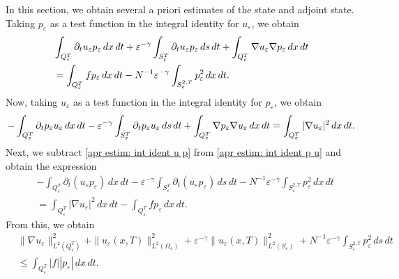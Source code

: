 \documentclass[10pt,a4paper]{amsart}
\numberwithin{equation}{section}
\begin{document}
In this section, we obtain several a priori estimates of the state and adjoint
state. Taking $p_{\varepsilon }$ as a test function in the integral identity
for $u_{\varepsilon }$, we obtain
\begin{equation}
\begin{aligned}
&\int _{Q_{\varepsilon }^{T}}\partial _{t}u_{\varepsilon
}p_{\varepsilon }\,dx\,dt+\varepsilon ^{-\gamma }\int _{S_{\varepsilon
}^{T}}\partial _{t}u_{\varepsilon }p_{\varepsilon }\,ds\,dt+\int
_{Q_{\varepsilon }^{T}}\nabla u_{\varepsilon }\nabla p_{\varepsilon }{%
\,dx\,dt} \\
&=\int _{Q_{\varepsilon }^{T}}fp_{\varepsilon }\,dx\,dt%
-N^{-1}\varepsilon ^{-\gamma }\int _{S_{\varepsilon
}^{2,T}}p_{\varepsilon }^2\,dx\,dt.
\end{aligned} \label{apr estim: int ident u p}
\end{equation}
Now, taking $u_{\varepsilon }$ as a test function in the integral identity
for $p_{\varepsilon }$, we obtain
\begin{equation}
-\int _{Q_{\varepsilon }^{T}}\partial _{t}p_{\varepsilon
}u_{\varepsilon }\,dx\,dt-\varepsilon ^{-\gamma }\int _{S_{\varepsilon
}^{T}}\partial _{t}p_{\varepsilon }u_{\varepsilon }\,ds\,dt+\int
_{Q_{\varepsilon }^{T}}\nabla p_{\varepsilon }\nabla u_{\varepsilon }{%
\,dx\,dt}
=\int _{Q_{\varepsilon }^{T}}|\nabla u_{\varepsilon }|^2\,dx\,dt.
\label{apr estim: int ident p u}
\end{equation}%
Next, we subtract \eqref{apr estim: int ident u p} from
\eqref{apr estim: int ident p u} and obtain the expression
\begin{align*}
&-\int _{Q_{\varepsilon }^{T}}\partial _{t}(u_{\varepsilon
}p_{\varepsilon })\,dx\,dt-\varepsilon ^{-\gamma }\int _{S_{\varepsilon
}^{T}}\partial _{t}(u_{\varepsilon }p_{\varepsilon })\,ds\,dt%
-N^{-1}\varepsilon ^{-\gamma }\int _{S_{\varepsilon
}^{2,T}}p_{\varepsilon }^2\,dx\,dt \\
&=\int _{Q_{\varepsilon }^{T}}|\nabla u_{\varepsilon }|^2\,dx\,dt-\int
_{Q_{\varepsilon }^{T}}fp_{\varepsilon }\,dx\,dt.
\end{align*}
From this, we obtain
\begin{equation}
\begin{aligned}
&\| \nabla u_{\varepsilon }\| _{L^2(Q_{\varepsilon }^{T})}^2+\|
u_{\varepsilon }(x,T)\| _{L^2(\Omega _{\varepsilon })}^2+\varepsilon
^{-\gamma }\| u_{\varepsilon }(x,T)\| _{L^2(S_{\varepsilon })}^2
+N^{-1}\varepsilon ^{-\gamma }\int _{S_{\varepsilon
}^{2,T}}p_{\varepsilon }^2\,ds\,dt \\
&\leq \int _{Q_{\varepsilon
}^{T}}|f||p_{\varepsilon }|\,dx\,dt.
\end{aligned}  \label{apr estim: u estim 1}
\end{equation}
\end{document}
